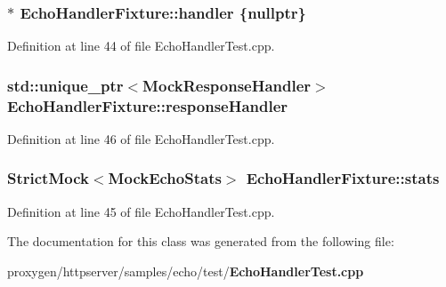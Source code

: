 \subsubsection[{handler}]{$\ast$ Echo\+Handler\+Fixture\+::handler \{{\bf nullptr}\}\hspace{0.3cm}{\ttfamily [protected]}}\label{classEchoHandlerFixture_a8c87741598fe9bea6be899c79f754310}


Definition at line 44 of file Echo\+Handler\+Test.\+cpp.

\subsubsection[{response\+Handler}]{\setlength{\rightskip}{0pt plus 5cm}std\+::unique\+\_\+ptr$<${\bf Mock\+Response\+Handler}$>$ Echo\+Handler\+Fixture\+::response\+Handler\hspace{0.3cm}{\ttfamily [protected]}}\label{classEchoHandlerFixture_af2e2b472637ff5fffae721581ba29a4b}


Definition at line 46 of file Echo\+Handler\+Test.\+cpp.

\subsubsection[{stats}]{\setlength{\rightskip}{0pt plus 5cm}Strict\+Mock$<${\bf Mock\+Echo\+Stats}$>$ Echo\+Handler\+Fixture\+::stats\hspace{0.3cm}{\ttfamily [protected]}}\label{classEchoHandlerFixture_adda2ebe970af7c852303d62f8f1e5a1f}


Definition at line 45 of file Echo\+Handler\+Test.\+cpp.



The documentation for this class was generated from the following file\+:\begin{DoxyCompactItemize}
\item 
proxygen/httpserver/samples/echo/test/{\bf Echo\+Handler\+Test.\+cpp}\end{DoxyCompactItemize}
